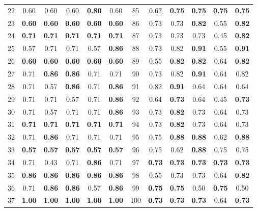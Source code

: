 \documentclass{article}
\begin{document}
{\begin{longtable}{cccccc@{\qquad}cccccc}
22 & 0.60 & 0.60 & 0.60 & \textbf{0.80} & 0.60 & 85 & 0.62 & \textbf{0.75} & \textbf{0.75} & \textbf{0.75} & \textbf{0.75} \\
23 & \textbf{0.60} & \textbf{0.60} & \textbf{0.60} & \textbf{0.60} & \textbf{0.60} & 86 & 0.73 & 0.73 & \textbf{0.82} & 0.55 & \textbf{0.82} \\
24 & \textbf{0.71} & \textbf{0.71} & \textbf{0.71} & \textbf{0.71} & \textbf{0.71} & 87 & 0.73 & 0.73 & 0.73 & 0.45 & \textbf{0.82} \\
25 & 0.57 & 0.71 & 0.71 & 0.57 & \textbf{0.86} & 88 & 0.73 & 0.82 & \textbf{0.91} & 0.55 & \textbf{0.91} \\
26 & \textbf{0.60} & \textbf{0.60} & \textbf{0.60} & \textbf{0.60} & \textbf{0.60} & 89 & 0.55 & \textbf{0.82} & \textbf{0.82} & 0.64 & \textbf{0.82} \\
27 & 0.71 & \textbf{0.86} & \textbf{0.86} & 0.71 & 0.71 & 90 & 0.73 & 0.82 & \textbf{0.91} & 0.64 & 0.82 \\
28 & 0.71 & 0.57 & \textbf{0.86} & 0.71 & \textbf{0.86} & 91 & 0.82 & \textbf{0.91} & 0.64 & 0.64 & 0.64 \\
29 & 0.71 & 0.71 & 0.57 & 0.71 & \textbf{0.86} & 92 & 0.64 & \textbf{0.73} & 0.64 & 0.45 & \textbf{0.73} \\
30 & 0.71 & 0.57 & 0.71 & 0.71 & \textbf{0.86} & 93 & 0.73 & \textbf{0.82} & 0.73 & 0.64 & 0.73 \\
31 & \textbf{0.71} & \textbf{0.71} & \textbf{0.71} & \textbf{0.71} & \textbf{0.71} & 94 & 0.73 & \textbf{0.82} & 0.73 & 0.64 & 0.73 \\
32 & 0.71 & \textbf{0.86} & 0.71 & 0.71 & 0.71 & 95 & 0.75 & \textbf{0.88} & \textbf{0.88} & 0.62 & \textbf{0.88} \\
33 & \textbf{0.57} & \textbf{0.57} & \textbf{0.57} & \textbf{0.57} & \textbf{0.57} & 96 & 0.75 & 0.62 & \textbf{0.88} & 0.75 & 0.75 \\
34 & 0.71 & 0.43 & 0.71 & \textbf{0.86} & 0.71 & 97 & \textbf{0.73} & \textbf{0.73} & \textbf{0.73} & \textbf{0.73} & \textbf{0.73} \\
35 & \textbf{0.86} & \textbf{0.86} & \textbf{0.86} & \textbf{0.86} & \textbf{0.86} & 98 & 0.55 & 0.73 & 0.73 & 0.64 & \textbf{0.82} \\
36 & 0.71 & \textbf{0.86} & \textbf{0.86} & 0.57 & \textbf{0.86} & 99 & \textbf{0.75} & \textbf{0.75} & 0.50 & \textbf{0.75} & 0.50 \\
37 & \textbf{1.00} & \textbf{1.00} & \textbf{1.00} & \textbf{1.00} & \textbf{1.00} & 100 & \textbf{0.73} & \textbf{0.73} & \textbf{0.73} & 0.64 & \textbf{0.73} \\

\end{longtable}}
\end{document}
